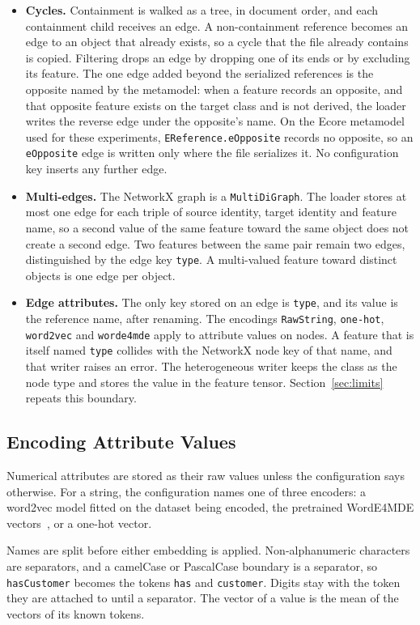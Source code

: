 \documentclass[journal,article,submit,moreauthors,technologies]{Definitions/mdpi}
\newcommand{\rev}[1]{#1}
\begin{document}
\begin{itemize}
    \item \rev{\textbf{Cycles.} Containment is walked as a tree, in document order, and each containment child receives an edge. A non-containment reference becomes an edge to an object that already exists, so a cycle that the file already contains is copied. Filtering drops an edge by dropping one of its ends or by excluding its feature. The one edge added beyond the serialized references is the opposite named by the metamodel: when a feature records an opposite, and that opposite feature exists on the target class and is not derived, the loader writes the reverse edge under the opposite's name. On the Ecore metamodel used for these experiments, \texttt{EReference.eOpposite} records no opposite, so an \texttt{eOpposite} edge is written only where the file serializes it. No configuration key inserts any further edge.}
    \item \rev{\textbf{Multi-edges.} The NetworkX graph is a \texttt{MultiDiGraph}. The loader stores at most one edge for each triple of source identity, target identity and feature name, so a second value of the same feature toward the same object does not create a second edge. Two features between the same pair remain two edges, distinguished by the edge key \texttt{type}. A multi-valued feature toward distinct objects is one edge per object.}
    \item \rev{\textbf{Edge attributes.} The only key stored on an edge is \texttt{type}, and its value is the reference name, after renaming. The encodings \texttt{RawString}, \texttt{one-hot}, \texttt{word2vec} and \texttt{worde4mde} apply to attribute values on nodes. A feature that is itself named \texttt{type} collides with the NetworkX node key of that name, and that writer raises an error. The heterogeneous writer keeps the class as the node type and stores the value in the feature tensor. Section~\ref{sec:limits} repeats this boundary.}
\end{itemize}

\subsection{Encoding Attribute Values}\label{sec:avalues}
\rev{Numerical attributes are stored as their raw values unless the configuration says otherwise. For a string, the configuration names one of three encoders: a word2vec model fitted on the dataset being encoded, the pretrained WordE4MDE vectors~\cite{lopez2023word}, or a one-hot vector.}

\rev{Names are split before either embedding is applied. Non-alphanumeric characters are separators, and a camelCase or PascalCase boundary is a separator, so \texttt{hasCustomer} becomes the tokens \texttt{has} and \texttt{customer}. Digits stay with the token they are attached to until a separator. The vector of a value is the mean of the vectors of its known tokens.}
\end{document}

